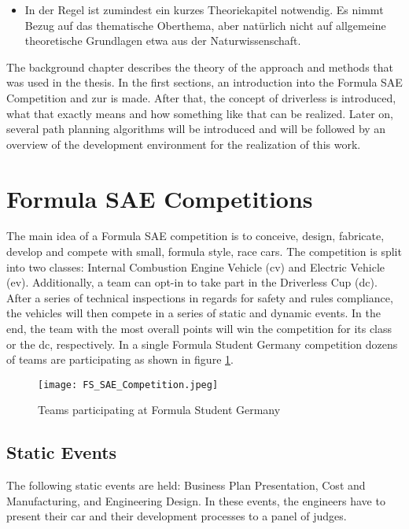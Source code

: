 \begin{itemize}
    \item In der Regel ist zumindest ein kurzes Theoriekapitel notwendig. Es nimmt Bezug auf das thematische Oberthema, aber natürlich nicht auf allgemeine theoretische Grundlagen etwa aus der Naturwissenschaft.
\end{itemize}
The background chapter describes the theory of the approach and methods that was used in the thesis. In the first sections, an introduction into the Formula SAE Competition and \acrlong{zur} is made. After that, the concept of driverless is introduced, what that exactly means and how something like that can be realized. Later on, several path planning algorithms will be introduced and will be followed by an overview of the development environment for the realization of this work.

\section{Formula SAE Competitions} \label{sec:Formula SAE Competitions}
The main idea of a Formula SAE competition is to conceive, design, fabricate, develop and compete with small, formula style, race cars.
The competition is split into two classes: Internal Combustion Engine Vehicle (\acrshort{cv}) and Electric Vehicle (\acrshort{ev}).
Additionally, a team can opt-in to take part in the Driverless Cup (\acrshort{dc}).
After a series of technical inspections in regards for safety and rules compliance, the vehicles will then compete in a series of static and dynamic events. In the end, the team with the most overall points will win the competition for its class or the \acrlong{dc}, respectively. \cite{fs_rules_2022_handbook}
In a single Formula Student Germany competition dozens of teams are participating as shown in figure \ref{fig:FS SAE Competition}.
\begin{figure}[H]
    \centering
    \texttt{[image: FS\_SAE\_Competition.jpeg]}
    \caption{Teams participating at Formula Student Germany \cite{fs_germany}}
    \label{fig:FS SAE Competition}
\end{figure}

\subsection{Static Events} \label{sec:Static Events}
The following static events are held: Business Plan Presentation, Cost and Manufacturing, and Engineering Design. In these events, the engineers have to present their car and their development processes to a panel of judges. \cite{fs_rules_2022_handbook}

